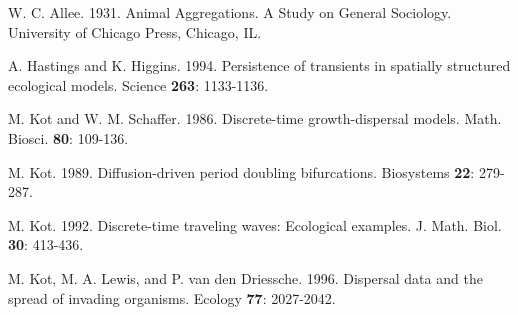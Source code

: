 \documentclass[11pt]{article}
\theoremstyle{definition}
\numberwithin{equation}{section}
\numberwithin{thm}{section}
\begin{document}
\begin{figure}
\begin{minipage}{.5\textwidth}
\end{minipage}
\par
\medskip
\noindent
\begin{minipage}[t]{.49\textwidth}
  \centering
  \label{fig:uniformplot1}
\end{minipage}%
\hfill
\begin{minipage}[t]{.49\textwidth}
  \centering
  \label{fig:uniformplot2}
\end{minipage}
\end{figure}


\begin{thebibliography}{9}
  W. C. Allee. 1931. Animal Aggregations. A Study on
General Sociology. University of Chicago Press, Chicago, IL.



 A. Hastings and K. Higgins. 1994. Persistence of transients in spatially
structured ecological models. Science {\bf 263}: 1133-1136.



 M. Kot and W. M. Schaffer. 1986.  Discrete-time growth-dispersal models.
Math. Biosci. {\bf 80}: 109-136.


 M. Kot. 1989. Diffusion-driven period doubling bifurcations.
Biosystems {\bf 22}: 279-287.


 M. Kot. 1992. Discrete-time traveling waves:
Ecological examples. J. Math. Biol. {\bf 30}: 413-436.


 M. Kot, M. A. Lewis, and P. van den Driessche. 1996. Dispersal data and the spread of invading
organisms. Ecology {\bf 77}: 2027-2042.







\end{thebibliography}
\end{document}
